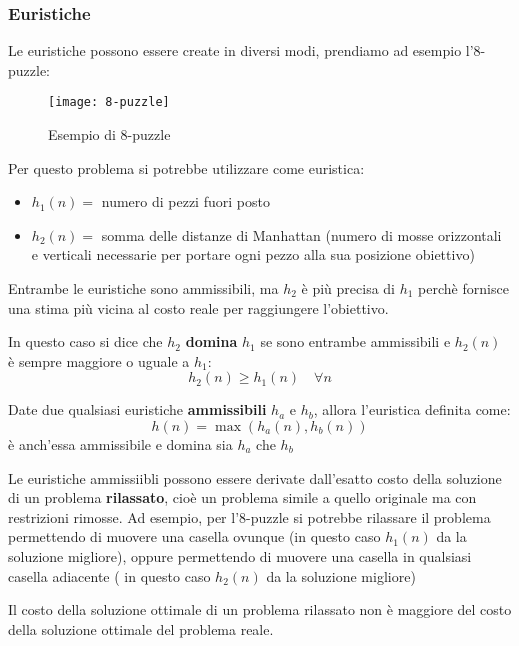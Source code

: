 \documentclass[a4paper]{article}
\begin{document}
\subsubsection{Euristiche}
Le euristiche possono essere create in diversi modi, prendiamo ad esempio l'8-puzzle:
\begin{figure}[H]
  \centering
  \texttt{[image: 8-puzzle]}
  \caption{Esempio di 8-puzzle}
\end{figure}
Per questo problema si potrebbe utilizzare come euristica:
\begin{itemize}
  \item \( h_1(n) = \) numero di pezzi fuori posto
  \item \( h_2(n) = \) somma delle distanze di Manhattan (numero di mosse orizzontali e verticali
    necessarie per portare ogni pezzo alla sua posizione obiettivo)
\end{itemize}
Entrambe le euristiche sono ammissibili, ma \( h_2 \) è più precisa di \( h_1 \) perchè
fornisce una stima più vicina al costo reale per raggiungere l'obiettivo.

In questo caso si dice che \( h_2 \) \textbf{domina} \( h_1 \) se sono entrambe ammissibili
e \( h_2(n) \) è sempre maggiore o uguale a \( h_1 \):
\[
  h_2(n) \ge h_1(n) \quad \forall n
\] 

\begin{theorem}
  Date due qualsiasi euristiche \textbf{ammissibili} \( h_a \) e \( h_b \),
  allora l'euristica definita come:
  \[
    h(n) = \max(h_a(n), h_b(n))
  \]
  è anch'essa ammissibile e domina sia \( h_a \) che \( h_b \)
\end{theorem}

\noindent
Le euristiche ammissiibli possono essere derivate dall'esatto costo della soluzione di un
problema \textbf{rilassato}, cioè un problema simile a quello originale ma con
restrizioni rimosse. Ad esempio, per l'8-puzzle si potrebbe rilassare il problema
permettendo di muovere una casella ovunque (in questo caso \( h_1(n) \) da la soluzione
migliore), oppure permettendo di muovere una casella in qualsiasi casella adiacente (
in questo caso \( h_2(n) \) da la soluzione migliore)

\begin{define}
  Il costo della soluzione ottimale di un problema rilassato non è maggiore del costo
  della soluzione ottimale del problema reale.
\end{define}
\end{document}

